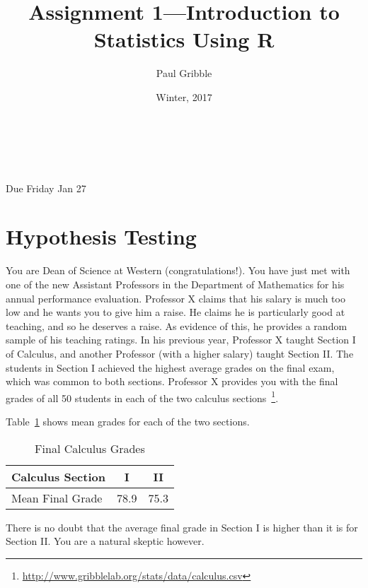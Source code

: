 \documentclass[10pt]{article}
\title{Assignment 1---Introduction to Statistics Using R}
\author{Paul Gribble}
\date{Winter, 2017}
\makeatletter
\renewcommand{\maketitle}{
\begin{flushleft}          %
{\Large\sffamily\bfseries\@title}   %
\vspace{2ex}\\            %
{\normalsize\sffamily\@author}           %
\vspace{0ex}\\             %
\normalsize\sffamily\@date                     %
\vspace{3ex}              %
\end{flushleft}
}
\makeatother
\begin{document}
\maketitle

\thispagestyle{empty}

{\flushleft \sffamily * Due Friday Jan 27}

\section{Hypothesis Testing}

You are Dean of Science at Western (congratulations!). You have just
met with one of the new Assistant Professors in the Department of
Mathematics for his annual performance evaluation. Professor X claims
that his salary is much too low and he wants you to give him a
raise. He claims he is particularly good at teaching, and so he
deserves a raise. As evidence of this, he provides a random sample of
his teaching ratings. In his previous year, Professor X taught Section
I of Calculus, and another Professor (with a higher salary) taught
Section II. The students in Section I achieved the highest average
grades on the final exam, which was common to both sections. Professor
X provides you with the final grades of all 50 students in each of the
two calculus
sections~\footnote{\url{http://www.gribblelab.org/stats/data/calculus.csv}}.

Table~\ref{calctable} shows mean grades for each of the two sections.

\begin{table}[h]
  \begin{center}
    \begin{tabular}{|l|cc|}
      \hline
      Calculus Section &I &II\\
      \hline
      Mean Final Grade &78.9 &75.3\\
      \hline
    \end{tabular}
    \caption{Final Calculus Grades}
    \label{calctable}
  \end{center}
\end{table}

There is no doubt that the average final grade in Section I is higher
than it is for Section II. You are a natural skeptic however.
\end{document}
